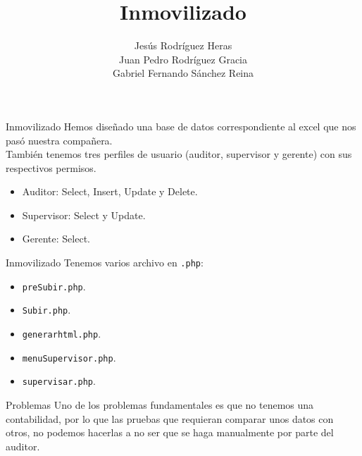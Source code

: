 \documentclass{beamer}
\title{Inmovilizado}
\author{Jesús Rodríguez Heras \\ Juan Pedro Rodríguez Gracia \\ Gabriel Fernando Sánchez Reina}
\begin{document}
\begin{frame}
  \titlepage
  
\end{frame}


\begin{frame}{Inmovilizado}
	Hemos diseñado una base de datos correspondiente al excel que nos pasó nuestra compañera.\\
	También tenemos tres perfiles de usuario (auditor, supervisor y gerente) con sus respectivos permisos.
	\begin{itemize}
		\item Auditor: Select, Insert, Update y Delete.
		\item Supervisor: Select y Update.
		\item Gerente: Select.
	\end{itemize}
\end{frame}

\begin{frame}{Inmovilizado}
	Tenemos varios archivo en \texttt{.php}:
	\begin{itemize}
		\item \texttt{preSubir.php}.
		\item \texttt{Subir.php}.
		\item \texttt{generarhtml.php}.
		\item \texttt{menuSupervisor.php}.
		\item \texttt{supervisar.php}.
	\end{itemize}
\end{frame}

\begin{frame}{Problemas}
	Uno de los problemas fundamentales es que no tenemos una contabilidad, por lo que las pruebas que requieran comparar unos datos con otros, no podemos hacerlas a no ser que se haga manualmente por parte del auditor.
\end{frame}
\end{document}
